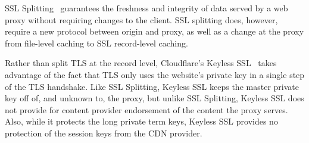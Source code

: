 SSL Splitting~\cite{ssl-splitting} guarantees the freshness and integrity of
data served by a web proxy without requiring changes to the client.
%
%
%
%
%
%
SSL splitting does, however, require a new protocol between origin and proxy, as
well as a change at the proxy from file-level caching to SSL record-level
caching.


Rather than split TLS at the record level, Cloudflare's
Keyless SSL~\cite{keyless-ssl} takes advantage of the fact that TLS only uses
the website's private key in a single step of the TLS handshake.
%
%
%
%
Like SSL Splitting, Keyless SSL keeps the master private key off of, and unknown
to, the proxy, but unlike SSL Splitting, Keyless SSL does not provide for
content provider endorsement of the content the proxy serves.  Also,
while it protects the long private term keys, Keyless SSL provides no protection of the session keys from the CDN provider.


